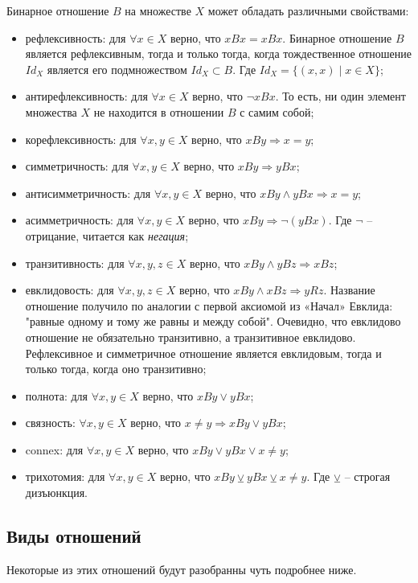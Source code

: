 \documentclass[a4paper]{book}
\begin{document}
Бинарное отношение $B$ на множестве $X$ может обладать различными свойствами: 

\begin{itemize}
	\item рефлексивность: для $\forall x\in X$ верно, что $xBx = xBx$. Бинарное отношение $B$ является рефлексивным, тогда и только тогда, когда тождественное отношение $Id_X$ является его подмножеством $Id_X\subset B$. Где $Id_X = \{(x,x)\mid x\in X\}$; 
	\item антирефлексивность: для $\forall x\in X$ верно, что $\neg xBx$. То есть, ни один элемент множества $X$ не находится в отношении $B$ с самим собой;
	\item корефлексивность: для $\forall x,y\in X$ верно, что $xBy \Rightarrow x = y$;
	\item симметричность: для $\forall x,y\in X$ верно, что $xBy \Rightarrow yBx$;
	\item антисимметричность: для $\forall x,y\in X$ верно, что $xBy \wedge yBx \Rightarrow x = y$;
	\item асимметричность: для $\forall x,y\in X$ верно, что $xBy \Rightarrow \neg(yBx)$. Где $\neg$ -- отрицание, читается как \textit{негация};
	\item транзитивность: для $\forall x,y,z\in X$ верно, что $xBy \wedge yBz \Rightarrow xBz$; 
	\item евклидовость: для $\forall x,y,z\in X$ верно, что $xBy \wedge xBz \Rightarrow yRz$. Название отношение получило по аналогии с первой аксиомой из «Начал» Евклида: "равные одному и тому же равны и между собой". Очевидно, что евклидово отношение не обязательно транзитивно, а транзитивное евклидово. Рефлексивное и симметричное отношение является евклидовым, тогда и только тогда, когда оно транзитивно;
	\item полнота: для $\forall x,y\in X$ верно, что $xBy \vee yBx$;
	\item связность: $\forall x,y\in X$ верно, что $x\neq y \Rightarrow xBy \vee yBx$;
	\item connex: для $\forall x,y\in X$ верно, что $xBy \vee yBx\vee x\neq y$;
	\item трихотомия: для $\forall x,y\in X$ верно, что $xBy \veebar yBx \veebar x\neq y $. Где $\veebar$ -- строгая дизъюнкция. 
	
\end{itemize}

\subsection{Виды отношений}
Некоторые из этих отношений будут разобранны чуть подробнее ниже. 
\end{document}
